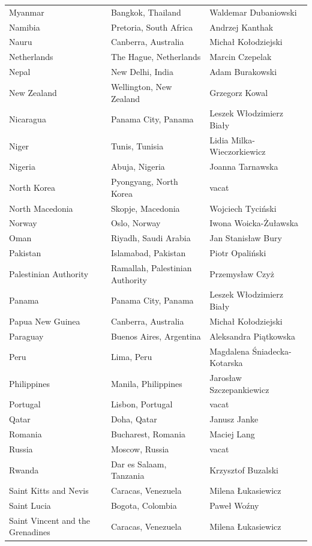 \documentclass{article}
\begin{document}
\begin{tabular}{lll}
Myanmar & Bangkok, Thailand & Waldemar Dubaniowski \\
Namibia & Pretoria, South Africa & Andrzej Kanthak \\
Nauru & Canberra, Australia & Michał Kołodziejski \\
Netherlands & The Hague, Netherlands & Marcin Czepelak \\
Nepal & New Delhi, India & Adam Burakowski \\
New Zealand & Wellington, New Zealand & Grzegorz Kowal \\
Nicaragua & Panama City, Panama & Leszek Włodzimierz Biały \\
Niger & Tunis, Tunisia & Lidia Milka-Wieczorkiewicz \\
Nigeria & Abuja, Nigeria & Joanna Tarnawska \\
North Korea & Pyongyang, North Korea & vacat \\
North Macedonia & Skopje, Macedonia & Wojciech Tyciński \\
Norway & Oslo, Norway & Iwona Woicka-Żuławska \\
Oman & Riyadh, Saudi Arabia & Jan Stanisław Bury \\
Pakistan & Islamabad, Pakistan & Piotr Opaliński \\
Palestinian Authority & Ramallah, Palestinian Authority & Przemysław Czyż \\
Panama & Panama City, Panama & Leszek Włodzimierz Biały \\
Papua New Guinea & Canberra, Australia & Michał Kołodziejski \\
Paraguay & Buenos Aires, Argentina & Aleksandra Piątkowska \\
Peru & Lima, Peru & Magdalena Śniadecka-Kotarska \\
Philippines & Manila, Philippines & Jarosław Szczepankiewicz \\
Portugal & Lisbon, Portugal & vacat \\
Qatar & Doha, Qatar & Janusz Janke \\
Romania & Bucharest, Romania & Maciej Lang \\
Russia & Moscow, Russia & vacat \\
Rwanda & Dar es Salaam, Tanzania & Krzysztof Buzalski \\
Saint Kitts and Nevis & Caracas, Venezuela & Milena Łukasiewicz \\
Saint Lucia & Bogota, Colombia & Paweł Woźny \\
Saint Vincent and the Grenadines & Caracas, Venezuela & Milena Łukasiewicz \\

\end{tabular}
\end{document}
